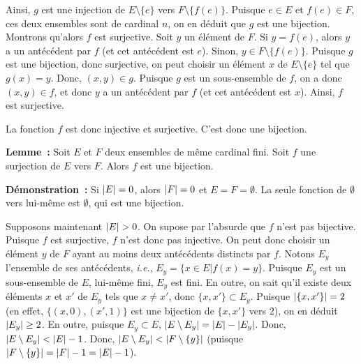     Ainsi, $g$ est une injection de $E \setminus \lbrace e \rbrace$ vers $F \setminus \lbrace f(e) \rbrace$. 
    Puisque $e \in E$ et $f(e) \in F$, ces deux ensembles sont de cardinal $n$, on en déduit que $g$ est une bijection. 
    Montrons qu'alors $f$ est surjective. 
    Soit $y$ un élément de $F$. 
    Si $y = f(e)$, alors $y$ a un antécédent par $f$ (et cet antécédent est $e$). 
    Sinon, $y \in F \setminus \lbrace f(e) \rbrace$. 
    Puisque $g$ est une bijection, donc surjective, on peut choisir un élément $x$ de $E \setminus \lbrace e \rbrace$ tel que $g(x) = y$.
    Donc, $(x,y) \in g$.
    Puisque $g$ est un sous-ensemble de $f$, on a donc $(x,y) \in f$, et donc $y$ a un antécédent par $f$ (et cet antécédent est $x$). 
    Ainsi, $f$ est surjective. 

    La fonction $f$ est donc injective et surjective. 
    C'est donc une bijection.

   \done 

\medskip

\noindent\textbf{Lemme :} Soit $E$ et $F$ deux ensembles de même cardinal fini. 
    Soit $f$ une surjection de $E$ vers $F$.
    Alors $f$ est une bijection. 

\medskip

\noindent\textbf{Démonstration :} 
    Si $\left\lvert E \right\rvert = 0$, alors $\left\lvert F \right\rvert = 0$ et $E = F = \emptyset$. 
    La seule fonction de $\emptyset$ vers lui-même est $\emptyset$, qui est une bijection. 

    Supposons maintenant $\left\lvert E \right\rvert > 0$. 
    On supose par l'absurde que $f$ n'est pas bijective. 
    Puisque $f$ est surjective, $f$ n'est donc pas injective. 
    On peut donc choisir un élément $y$ de $F$ ayant au moins deux antécédents distincts par $f$. 
    Notons $E_y$ l'ensemble de ses antécédents, \textit{i.e.}, $E_y = \lbrace x \in E \vert f(x) = y \rbrace$. 
    Puisque $E_y$ est un sous-ensemble de $E$, lui-même fini, $E_y$ est fini. 
    En outre, on sait qu'il existe deux éléments $x$ et $x'$ de $E_y$ tels que $x \neq x'$, donc $\lbrace x, x' \rbrace \subset E_y$.
    Puisque $\left\lvert \lbrace x, x' \rbrace \right\rvert = 2$ (en effet, $\lbrace (x, 0), (x', 1) \rbrace$ est une bijection de $\lbrace x, x' \rbrace$ vers $2$), on en déduit $\left\lvert E_y \right\rvert \geq 2$.
    En outre, puisque $E_y \subset E$, $\left\lvert E \setminus E_y \right\rvert = \left\lvert E \right\rvert - \left\lvert E_y \right\rvert$. 
    Donc, $\left\lvert E \setminus E_y \right\rvert < \left\lvert E \right\rvert - 1$. 
    Donc, $\left\lvert E \setminus E_y \right\rvert < \left\lvert F \setminus \lbrace y \rbrace \right\rvert$ (puisque $\left\lvert F \setminus \lbrace y \rbrace \right\rvert = \left\lvert F \right\rvert - 1 = \left\lvert E \right\rvert - 1$). 

